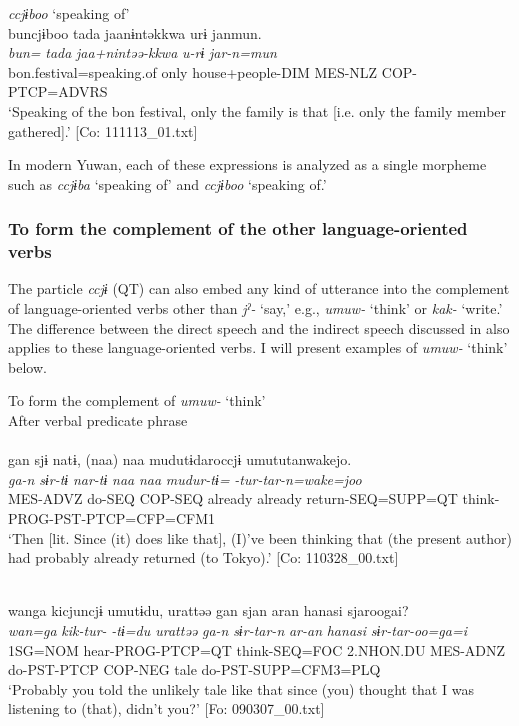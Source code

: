   \ex \textit{ccjɨboo} ‘speaking of’\\
      \glll    buncjɨboo  {\textbar}tada{\textbar}  jaanɨntəkkwa  urɨ  janmun.\\
    \textit{bun=}  \textit{tada}  \textit{jaa+nintəə-kkwa}  \textit{u-rɨ}  \textit{jar-n=mun}\\
    bon.festival=speaking.of  only  house+people{}-DIM  MES-NLZ  COP-PTCP=ADVRS\\
    \glt     ‘Speaking of the bon festival, only the family is that [i.e. only the family member gathered].’  [Co: 111113\_01.txt]
    \z
\z

In modern Yuwan, each of these expressions is analyzed as a single morpheme such as \textit{ccjɨba} ‘speaking of’ and \textit{ccjɨboo} ‘speaking of.’

\subsubsection{To form the complement of the other language-oriented verbs}\label{sec:10.4.1.2}

The particle \textit{ccjɨ} (QT) can also embed any kind of utterance into the complement of language-oriented verbs other than \textit{jˀ-} ‘say,’ e.g., \textit{umuw-} ‘think’ or \textit{kak-} ‘write.’ The difference between the direct speech and the indirect speech discussed in  also applies to these language-oriented verbs. I will present examples of \textit{umuw-} ‘think’ below.

\ea\label{ex:10.69}   To form the complement of \textit{umuw-} ‘think’\\
   After verbal predicate phrase\\
  \ea\relax  [= (10-52 b)]\\
      \glll    gan  sjɨ  natɨ,  (naa)  naa  mudutɨdaroccjɨ umututanwakejo.\\
      \textit{ga-n}  \textit{sɨr-tɨ}  \textit{nar-tɨ}  \textit{naa}  \textit{naa}  \textit{mudur-tɨ=} \textit{-tur-tar-n=wake=joo}\\
      MES-ADVZ  do-SEQ  COP-SEQ  already  already  return-SEQ=SUPP=QT  think-PROG-PST-PTCP=CFP=CFM1\\      
      \glt ‘Then [lit. Since (it) does like that], (I)’ve been thinking that (the present author) had probably already returned (to Tokyo).’  [Co: 110328\_00.txt]

  \ex\relax  [= (8-41)]\\
      \glll    wanga  kicjuncjɨ  umutɨdu,  urattəə  gan  sjan  aran  hanasi  sjaroogai?\\
      \textit{wan=ga}  \textit{kik-tur-}  \textit{-tɨ=du  urattəə}   \textit{ga-n}  \textit{sɨr-tar-n}  \textit{ar-an}  \textit{hanasi}  \textit{sɨr-tar-oo=ga=i}\\
      1SG=NOM  hear-PROG-PTCP=QT  think-SEQ=FOC  2.NHON.DU  MES-ADNZ  do-PST-PTCP  COP-NEG  tale  do-PST-SUPP=CFM3=PLQ\\
      \glt       ‘Probably you told the unlikely tale like that since (you) thought that I was listening to (that), didn’t you?’ [Fo: 090307\_00.txt]

